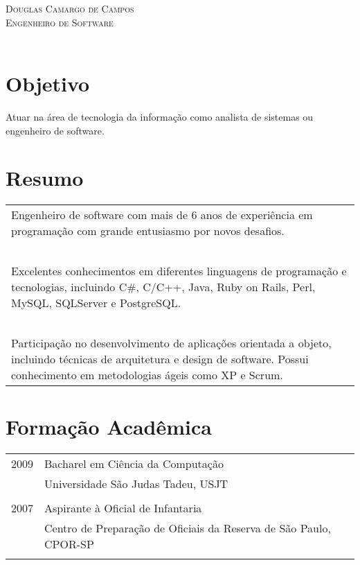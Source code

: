 \documentclass[a4paper, oneside, final]{scrartcl}
\begin{document}
\begin{center}
\textsc{{\Huge Douglas Camargo de Campos} \\ Engenheiro de Software}\\
\ \\
\end{center}

\section{Objetivo}
Atuar na área de tecnologia da informação como analista de sistemas ou engenheiro de software.

%

\section{Resumo}

\begin{tabularx}{0.97\linewidth}{X}
Engenheiro de software com mais de 6 anos de experiência em programação com grande entusiasmo por novos desafios. \\ \ \\

Excelentes conhecimentos em diferentes linguagens de programação e tecnologias, incluindo C\#, C/C++, Java, Ruby on Rails, Perl, MySQL, SQLServer e PostgreSQL. \\ \ \\

Participação no desenvolvimento de aplicações orientada a objeto, incluindo técnicas de arquitetura e design de software. Possui conhecimento em metodologias ágeis como XP e Scrum.
\end{tabularx}

\section{Formação Acadêmica}

\begin{tabularx}{0.97\linewidth}{p{2cm}X}
2009 & Bacharel em Ciência da Computação\\
     & Universidade São Judas Tadeu, USJT\\ \\

2007 & Aspirante à Oficial de Infantaria\\
     & Centro de Preparação de Oficiais da Reserva de São Paulo, CPOR-SP\\ \\
\end{tabularx}
\end{document}
